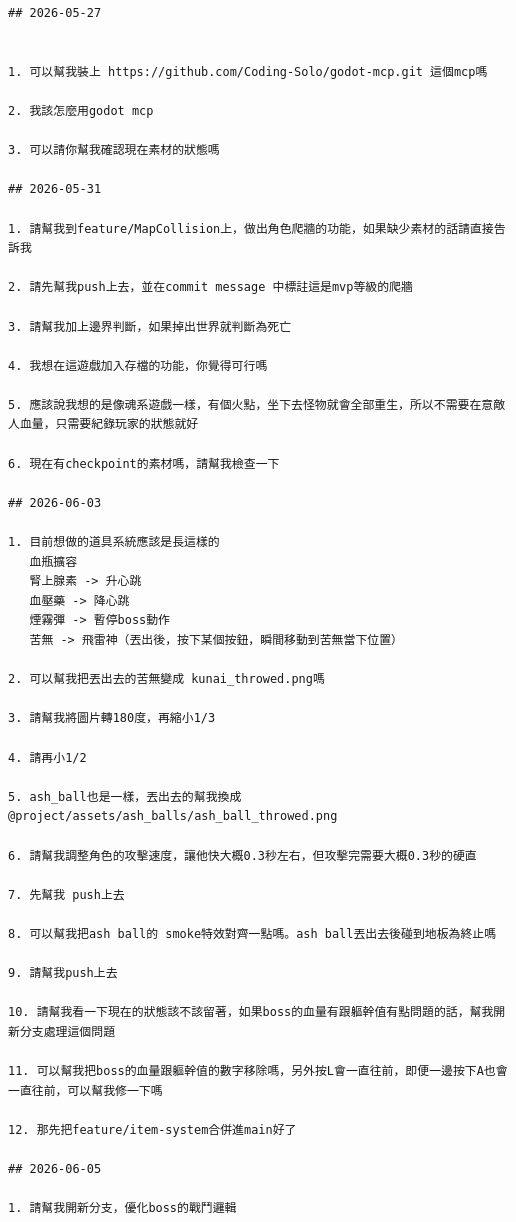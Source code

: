 \documentclass[12pt,a4paper]{article}
\begin{document}
\begin{lstlisting}[caption={楊立宇使用 Codex CLI 的 prompt 紀錄}]
## 2026-05-27


1. 可以幫我裝上 https://github.com/Coding-Solo/godot-mcp.git 這個mcp嗎

2. 我該怎麼用godot mcp

3. 可以請你幫我確認現在素材的狀態嗎

## 2026-05-31

1. 請幫我到feature/MapCollision上，做出角色爬牆的功能，如果缺少素材的話請直接告訴我

2. 請先幫我push上去，並在commit message 中標註這是mvp等級的爬牆

3. 請幫我加上邊界判斷，如果掉出世界就判斷為死亡

4. 我想在這遊戲加入存檔的功能，你覺得可行嗎

5. 應該說我想的是像魂系遊戲一樣，有個火點，坐下去怪物就會全部重生，所以不需要在意敵人血量，只需要紀錄玩家的狀態就好

6. 現在有checkpoint的素材嗎，請幫我檢查一下

## 2026-06-03

1. 目前想做的道具系統應該是長這樣的
   血瓶擴容
   腎上腺素 -> 升心跳
   血壓藥 -> 降心跳
   煙霧彈 -> 暫停boss動作
   苦無 -> 飛雷神（丟出後，按下某個按鈕，瞬間移動到苦無當下位置）

2. 可以幫我把丟出去的苦無變成 kunai_throwed.png嗎

3. 請幫我將圖片轉180度，再縮小1/3

4. 請再小1/2

5. ash_ball也是一樣，丟出去的幫我換成 @project/assets/ash_balls/ash_ball_throwed.png

6. 請幫我調整角色的攻擊速度，讓他快大概0.3秒左右，但攻擊完需要大概0.3秒的硬直

7. 先幫我 push上去

8. 可以幫我把ash ball的 smoke特效對齊一點嗎。ash ball丟出去後碰到地板為終止嗎

9. 請幫我push上去

10. 請幫我看一下現在的狀態該不該留著，如果boss的血量有跟軀幹值有點問題的話，幫我開新分支處理這個問題

11. 可以幫我把boss的血量跟軀幹值的數字移除嗎，另外按L會一直往前，即便一邊按下A也會一直往前，可以幫我修一下嗎

12. 那先把feature/item-system合併進main好了

## 2026-06-05

1. 請幫我開新分支，優化boss的戰鬥邏輯


\end{lstlisting}
\end{document}
